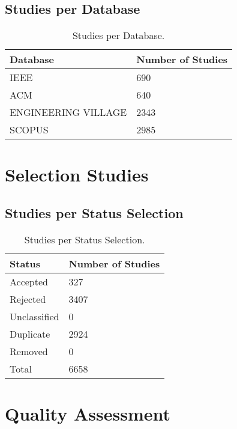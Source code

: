 \documentclass [11pt]{article}
\begin{document}
\subsection{Studies per Database}
\begin{table}[!htb]
\caption[Studies per Database]{Studies per Database.}
\label{tab:studiesDatabases}
\centering
\begin{tabular}{@{}ll@{}}
\toprule
\textbf{Database} & \textbf{Number of Studies} \\ \midrule
IEEE & 690 \\ 
ACM & 640 \\ 
ENGINEERING VILLAGE & 2343 \\ 
SCOPUS & 2985 \\ 
\end{tabular}
\end{table}

\section{Selection Studies}

\subsection{Studies per Status Selection}
\begin{table}[!htb]
\caption[Studies per Status Selection]{Studies per Status Selection.}
\label{tab:studiesSelection}
\centering
\begin{tabular}{@{}ll@{}}
\toprule
\textbf{Status} & \textbf{Number of Studies} \\ \midrule
Accepted & 327 \\ 
Rejected & 3407 \\ 
Unclassified & 0 \\ 
Duplicate & 2924 \\ 
Removed & 0 \\ 
Total & 6658 \\ 
\end{tabular}
\end{table}

\section{Quality Assessment}
\end{document}
